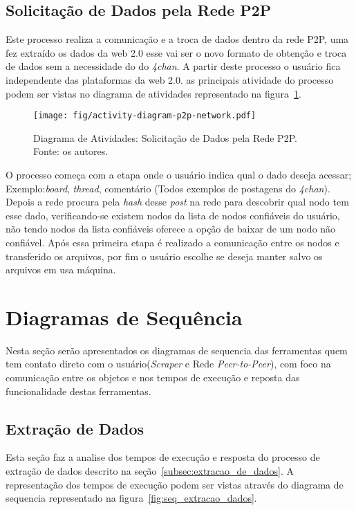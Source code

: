 \subsection{Solicitação de Dados pela Rede P2P\label{subsec:Solicitacao_Dados}}
Este processo realiza a comunicação e a troca de dados dentro da rede P2P, uma fez extraído os dados da web 2.0 esse vai ser o novo formato de obtenção e troca de dados sem a necessidade do 
do \textit{4chan}. A partir deste processo o usuário fica independente das plataformas da web 2.0. as principais atividade do processo podem ser vistas no diagrama de atividades representado na figura~\ref{fig:Solicitacao_Dados}.

\begin{figure}[htb]
    \texttt{[image: fig/activity-diagram-p2p-network.pdf]}
    \caption[Activity diagram: P2P network data download]{
        Diagrama de Atividades: Solicitação de Dados pela Rede P2P.\\
        Fonte: os autores.
    }
    \label{fig:Solicitacao_Dados}
\end{figure}

O processo começa com a etapa onde o usuário indica qual o dado deseja acessar; Exemplo:\textit{board}, \textit{thread}, comentário (Todos exemplos de postagens do \textit{4chan}). Depois a rede procura pela \textit{hash} desse \textit{post} na rede para descobrir qual nodo tem esse dado, verificando-se existem nodos da lista de nodos confiáveis do usuário, não tendo nodos da lista confiáveis oferece a opção de baixar
de um nodo não confiável. Após essa primeira etapa é realizado a comunicação entre os nodos e transferido os arquivos, por fim o usuário escolhe se deseja manter salvo os arquivos 
em usa máquina. 
\section{Diagramas de Sequência}
Nesta seção serão apresentados os diagramas de sequencia das ferramentas quem tem contato direto com o usuário(\textit{Scraper} e Rede \textit{Peer-to-Peer}), com foco na comunicação entre os objetos e nos tempos de execução e reposta das funcionalidade destas ferramentas.
\subsection{Extração de Dados}
Esta seção faz a analise dos tempos de execução e resposta do processo de extração de dados descrito na seção~\ref{subsec:extracao_de_dados}.
A representação dos tempos de execução podem ser vistas através do diagrama de sequencia representado na figura~\ref{fig:seq_extracao_dados}.

